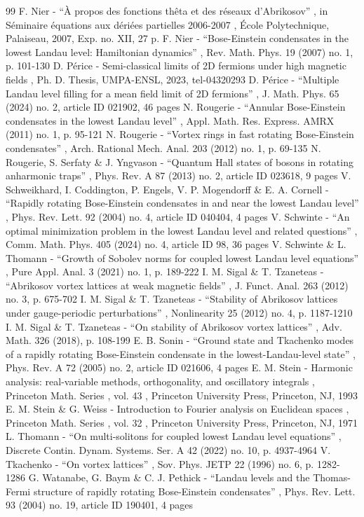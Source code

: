 \begin{thebibliography}{99}
 F. Nier - “À propos des fonctions thêta et des réseaux d’Abrikosov” , in Séminaire équations aux dériées partielles 2006-2007 , École Polytechnique, Palaiseau, 2007, Exp. no. XII, 27 p.
 F. Nier - “Bose-Einstein condensates in the lowest Landau level: Hamiltonian dynamics” , Rev. Math. Phys. 19 (2007) no. 1, p. 101-130
 D. Périce - Semi-classical limits of 2D fermions under high magnetic fields , Ph. D. Thesis, UMPA-ENSL, 2023, tel-04320293
 D. Périce - “Multiple Landau level filling for a mean field limit of 2D fermions” , J. Math. Phys. 65 (2024) no. 2, article ID 021902, 46 pages
 N. Rougerie - “Annular Bose-Einstein condensates in the lowest Landau level” , Appl. Math. Res. Express. AMRX (2011) no. 1, p. 95-121
 N. Rougerie - “Vortex rings in fast rotating Bose-Einstein condensates” , Arch. Rational Mech. Anal. 203 (2012) no. 1, p. 69-135
 N. Rougerie, S. Serfaty \& J. Yngvason - “Quantum Hall states of bosons in rotating anharmonic traps” , Phys. Rev. A 87 (2013) no. 2, article ID 023618, 9 pages
 V. Schweikhard, I. Coddington, P. Engels, V. P. Mogendorff \& E. A. Cornell - “Rapidly rotating Bose-Einstein condensates in and near the lowest Landau level” , Phys. Rev. Lett. 92 (2004) no. 4, article ID 040404, 4 pages
 V. Schwinte - “An optimal minimization problem in the lowest Landau level and related questions” , Comm. Math. Phys. 405 (2024) no. 4, article ID 98, 36 pages
 V. Schwinte \& L. Thomann - “Growth of Sobolev norms for coupled lowest Landau level equations” , Pure Appl. Anal. 3 (2021) no. 1, p. 189-222
 I. M. Sigal \& T. Tzaneteas - “Abrikosov vortex lattices at weak magnetic fields” , J. Funct. Anal. 263 (2012) no. 3, p. 675-702
 I. M. Sigal \& T. Tzaneteas - “Stability of Abrikosov lattices under gauge-periodic perturbations” , Nonlinearity 25 (2012) no. 4, p. 1187-1210
 I. M. Sigal \& T. Tzaneteas - “On stability of Abrikosov vortex lattices” , Adv. Math. 326 (2018), p. 108-199
 E. B. Sonin - “Ground state and Tkachenko modes of a rapidly rotating Bose-Einstein condensate in the lowest-Landau-level state” , Phys. Rev. A 72 (2005) no. 2, article ID 021606, 4 pages
 E. M. Stein - Harmonic analysis: real-variable methods, orthogonality, and oscillatory integrals , Princeton Math. Series , vol. 43 , Princeton University Press, Princeton, NJ, 1993
 E. M. Stein \& G. Weiss - Introduction to Fourier analysis on Euclidean spaces , Princeton Math. Series , vol. 32 , Princeton University Press, Princeton, NJ, 1971
 L. Thomann - “On multi-solitons for coupled lowest Landau level equations” , Discrete Contin. Dynam. Systems. Ser. A 42 (2022) no. 10, p. 4937-4964
 V. Tkachenko - “On vortex lattices” , Sov. Phys. JETP 22 (1996) no. 6, p. 1282-1286
 G. Watanabe, G. Baym \& C. J. Pethick - “Landau levels and the Thomas-Fermi structure of rapidly rotating Bose-Einstein condensates” , Phys. Rev. Lett. 93 (2004) no. 19, article ID 190401, 4 pages
\end{thebibliography}
